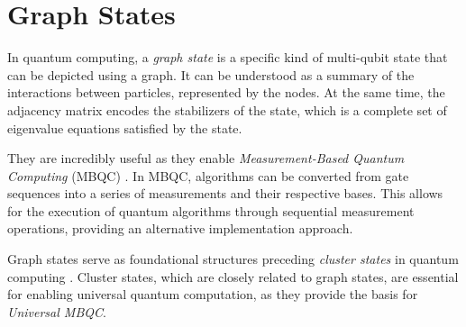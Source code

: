 \chapter{Graph States}
\label{Chap:graph_states}
\thispagestyle{fancy}

In quantum computing, a \emph{graph state} \cite{graph_state, rohde-graph-states} is a specific kind of multi-qubit state that can be depicted using a graph.
It can be understood as a summary of the interactions between particles, represented by the nodes.
At the same time, the adjacency matrix encodes the stabilizers of the state, which is a complete set of eigenvalue equations satisfied by the state. 

They are incredibly useful as they enable \emph{Measurement-Based Quantum Computing} (MBQC) \cite{MBQC}.
In MBQC, algorithms can be converted from gate sequences into a series of measurements and their respective bases. This allows for the execution of quantum algorithms through sequential measurement operations, providing an alternative implementation approach.

Graph states serve as foundational structures preceding \emph{cluster states} in quantum computing \cite{cluster_state}.
Cluster states, which are closely related to graph states, are essential for enabling universal quantum computation, as they provide the basis for \emph{Universal MBQC}.


